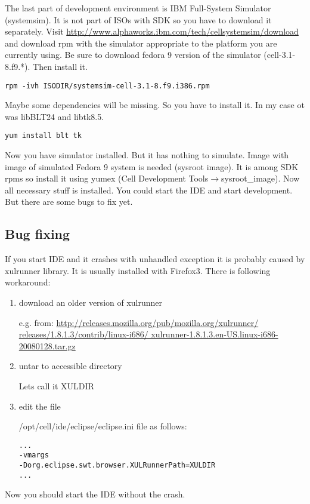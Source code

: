 The last part of development environment is IBM Full-System Simulator (systemsim).
It is not part of ISOs with SDK so you have to download it separately.
Visit \url{http://www.alphaworks.ibm.com/tech/cellsystemsim/download} and download rpm with the simulator appropriate to the platform you are currently using.
Be sure to download fedora 9 version of the simulator (cell-3.1-8.f9.*). Then install it.

\begin{verbatim}
rpm -ivh ISODIR/systemsim-cell-3.1-8.f9.i386.rpm
\end{verbatim}

Maybe some dependencies will be missing. So you have to install it. In my case ot was libBLT24 and libtk8.5.

\begin{verbatim}
yum install blt tk
\end{verbatim}

Now you have simulator installed. But it has nothing to simulate.
Image with image of simulated Fedora 9 system is needed (sysroot image).
It is among SDK rpms so install it using yumex (Cell Development Tools$\rightarrow$sysroot\_image).
Now all necessary stuff is installed.
 You could start the IDE and start development. But there are some bugs to fix yet.

\subsection{Bug fixing}

If you start IDE and it crashes with unhandled exception it is probably caused by xulrunner library.
It is usually installed with Firefox3. There is following workaround:
\begin{enumerate}
\item download an older version of xulrunner

e.g. from: \url{http://releases.mozilla.org/pub/mozilla.org/xulrunner/ releases/1.8.1.3/contrib/linux-i686/ xulrunner-1.8.1.3.en-US.linux-i686-20080128.tar.gz}

\item untar to accessible directory

Lets call it XULDIR

\item edit the file

/opt/cell/ide/eclipse/eclipse.ini file as follows:
\label{XULLFIX}
\begin{verbatim}
...
-vmargs
-Dorg.eclipse.swt.browser.XULRunnerPath=XULDIR
...
\end{verbatim}
\end{enumerate}
Now you should start the IDE without the crash.

